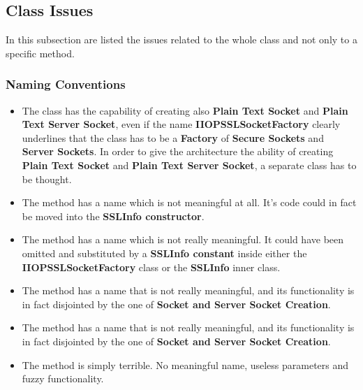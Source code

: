\subsection{Class Issues}
In this subsection are listed the issues related to the whole class and not only to a specific method.
\subsubsection{Naming Conventions}
\begin{itemize}
		\begin{itemize}
			\item
				The class has the capability of creating also \textbf{Plain Text Socket} and \textbf{Plain Text Server Socket}, even if the name \textbf{IIOPSSLSocketFactory} clearly underlines that the class has to be a \textbf{Factory} of \textbf{Secure Sockets} and \textbf{Server Sockets}.
				In order to give the architecture the ability of creating \textbf{Plain Text Socket} and \textbf{Plain Text Server Socket}, a separate class  has to be thought.
			\item
				The method
				has a name which is not meaningful at all.
				It's code could in fact be moved into the \textbf{SSLInfo constructor}.
			\item
				The method
				has a name which is not really meaningful.
				It could have been omitted and substituted by a \textbf{SSLInfo constant} inside either the \textbf{IIOPSSLSocketFactory} class or the \textbf{SSLInfo} inner class.
			\item
				The method
				has a name that is not really meaningful, and its functionality is in fact disjointed by the one of \textbf{Socket and Server Socket Creation}.
			\item
				The method 
				has a name that is not really meaningful, and its functionality is in fact disjointed by the one of \textbf{Socket and Server Socket Creation}.
			\item
				The method
				is simply terrible.
				No meaningful name, useless parameters and fuzzy functionality.
		\end{itemize}

\end{itemize}
